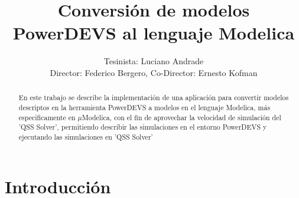\documentclass[a4paper,	11pt]{report}
\begin{document}
\renewcommand\floatpagefraction{.9}
\renewcommand\topfraction{.9}
\renewcommand\bottomfraction{.9}
\renewcommand\textfraction{.1}
\setcounter{totalnumber}{50}
\setcounter{topnumber}{50}
\setcounter{bottomnumber}{50}

\title{Conversión de modelos PowerDEVS al lenguaje Modelica}
\author{Tesinista: Luciano Andrade \\ Director: Federico Bergero, Co-Director: Ernesto Kofman} 

\maketitle
\tableofcontents

\begin{abstract}
En este trabajo se describe la implementación de una aplicación para convertir modelos descriptos en la herramienta PowerDEVS a modelos en el lenguaje Modelica, más especificamente en $\mu$Modelica, con el fin de aprovechar la velocidad de simulación del 'QSS Solver', permitiendo describir las simulaciones en el entorno PowerDEVS y ejecutando las simulaciones en 'QSS Solver'
\end{abstract}


\chapter{Introducción}
\end{document}
